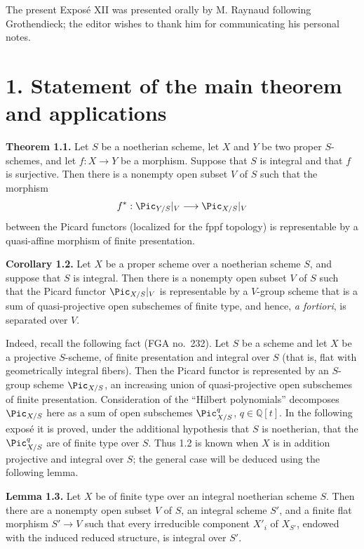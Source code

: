The present Expos\'e XII was presented orally by M. Raynaud following
Grothendieck; the editor wishes to thank him for communicating his personal
notes.

\section*{1. Statement of the main theorem and applications}

\textbf{Theorem 1.1.} Let $S$ be a noetherian scheme, let $X$ and $Y$ be two
proper $S$-schemes, and let $f:X\to Y$ be a morphism. Suppose that $S$ is
integral and that $f$ is surjective. Then there is a nonempty open subset $V$
of $S$ such that the morphism
\[
  f^*:\Pic_{Y/S}|_V\longrightarrow\Pic_{X/S}|_V
\]
between the Picard functors (localized for the fppf topology) is representable
by a quasi-affine morphism of finite presentation.

\textbf{Corollary 1.2.} Let $X$ be a proper scheme over a noetherian scheme
$S$, and suppose that $S$ is integral. Then there is a nonempty open subset
$V$ of $S$ such that the Picard functor $\Pic_{X/S}|_V$ is representable by a
$V$-group scheme that is a sum of quasi-projective open subschemes of finite
type, and hence, \emph{a fortiori}, is separated over $V$.

Indeed, recall the following fact (FGA no.~232). Let $S$ be a scheme and let
$X$ be a projective $S$-scheme, of finite presentation and integral over $S$
(that is, flat with geometrically integral fibers). Then the Picard functor is
represented by an $S$-group scheme $\Pic_{X/S}$, an increasing union of
quasi-projective open subschemes of finite presentation. Consideration of the
``Hilbert polynomials'' decomposes $\Pic_{X/S}$ here as a sum of open
subschemes $\Pic^q_{X/S}$, $q\in\mathbb Q[t]$. In the following expos\'e it is
proved, under the additional hypothesis that $S$ is noetherian, that the
$\Pic^q_{X/S}$ are of finite type over $S$. Thus 1.2 is known when $X$ is in
addition projective and integral over $S$; the general case will be deduced
using the following lemma.

\textbf{Lemma 1.3.} Let $X$ be of finite type over an integral noetherian
scheme $S$. Then there are a nonempty open subset $V$ of $S$, an integral
scheme $S'$, and a finite
flat morphism $S'\to V$ such that every irreducible component $X'_i$ of
$X_{S'}$, endowed with the induced reduced structure, is integral over $S'$.

